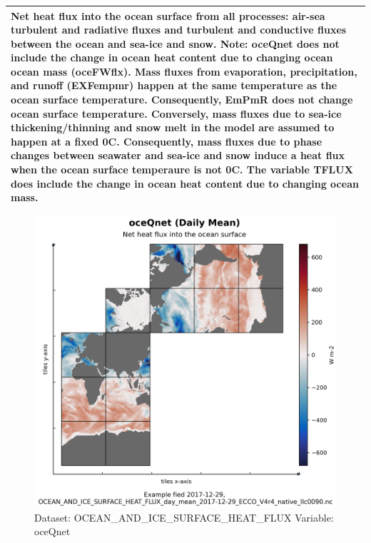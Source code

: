\begin{longtable}{|m{}|m{}|m{}|m{}|}
\multicolumn{4}{|p{1\textwidth}|}{Net heat flux into the ocean surface from all processes: air-sea turbulent and radiative fluxes and turbulent and conductive fluxes between the ocean and sea-ice and snow. Note: oceQnet does not include the change in ocean heat content due to changing ocean ocean mass (oceFWflx). Mass fluxes from evaporation, precipitation, and runoff (EXFempmr) happen at the same temperature as the ocean surface temperature. Consequently, EmPmR does not change ocean surface temperature. Conversely, mass fluxes due to sea-ice thickening/thinning and snow melt in the model are assumed to happen at a fixed 0C. Consequently, mass fluxes due to phase changes between seawater and sea-ice and snow induce a heat flux when the ocean surface temperaure is not 0C. The variable TFLUX does include the change in ocean heat content due to changing ocean mass.} \\ \hline
\end{longtable}

\begin{figure}[H]
\centering
\includegraphics[scale=0.55]{../images/plots/native_plots/Ocean_and_Sea-Ice_Surface_Heat_Fluxes/oceQnet.png}
\caption{Dataset: OCEAN\_AND\_ICE\_SURFACE\_HEAT\_FLUX Variable: oceQnet}
\label{tab:table-OCEAN_AND_ICE_SURFACE_HEAT_FLUX_oceQnet-Plot}
\end{figure}
\pagebreak
